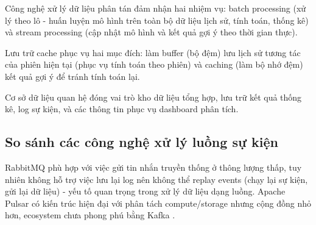 \documentclass[../BTL.tex]{subfiles}
\begin{document}
Công nghệ xử lý dữ liệu phân tán đảm nhận hai nhiệm vụ: batch processing (xử lý theo lô - huấn luyện mô hình trên toàn bộ dữ liệu lịch sử, tính toán, thống kê) và stream processing (cập nhật mô hình và kết quả gợi ý theo thời gian thực).

Lưu trữ cache phục vụ hai mục đích: làm buffer (bộ đệm) lưu lịch sử tương tác của phiên hiện tại (phục vụ tính toán theo phiên) và caching (làm bộ nhớ đệm) kết quả gợi ý để tránh tính toán lại.

Cơ sở dữ liệu quan hệ đóng vai trò kho dữ liệu tổng hợp, lưu trữ kết quả thống kê, log sự kiện, và các thông tin phục vụ dashboard phân tích.

\subsection{So sánh các công nghệ xử lý luồng sự kiện}

\begin{table}[H]
\centering
{}
\caption{So sánh Apache Kafka với các công nghệ mã nguồn mở thay thế}
\label{tab:kafka_compare}
\end{table}

RabbitMQ phù hợp với việc gửi tin nhắn truyền thống ở thông lượng thấp, tuy nhiên không hỗ trợ việc lưu lại log nên không thể replay events (chạy lại sự kiện, gửi lại dữ liệu) - yếu tố quan trọng trong xử lý dữ liệu dạng luồng. Apache Pulsar có kiến trúc hiện đại với phân tách compute/storage nhưng cộng đồng nhỏ hơn, ecosystem chưa phong phú bằng Kafka \cite{kafka_vs_rabbitmq}.
\end{document}
